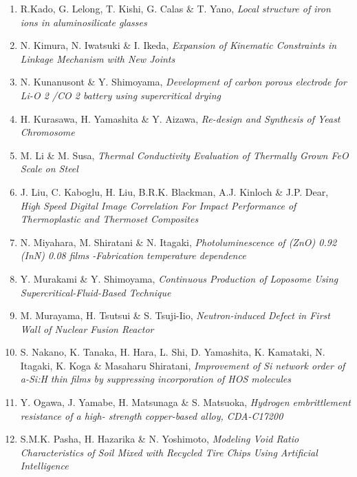 \begin{enumerate}[label=A\arabic*]
\item R.Kado, G. Lelong, T. Kishi, G. Calas \& T. Yano, {\em Local structure of iron ions
in aluminosilicate glasses}

\item N. Kimura, N. Iwatsuki \& I. Ikeda, {\em Expansion of Kinematic Constraints in Linkage
Mechanism with New Joints}

\item     N. Kunanusont \& Y. Shimoyama, {\em Development of carbon porous electrode
for Li-O 2 /CO 2 battery using supercritical drying}

\item  H. Kurasawa, H. Yamashita \& Y. Aizawa, {\em Re-design and Synthesis of Yeast Chromosome}

\item M. Li \& M. Susa, {\em Thermal Conductivity Evaluation of Thermally
Grown FeO Scale on Steel}

\item J. Liu, C. Kaboglu, H. Liu, B.R.K. Blackman, A.J. Kinloch \& J.P. Dear, {\em
  High Speed Digital Image Correlation For Impact
Performance of Thermoplastic and Thermoset
Composites}

\item N. Miyahara, M. Shiratani \& N. Itagaki, {\em Photoluminescence of (ZnO) 0.92 (InN) 0.08 films
-Fabrication temperature dependence}

\item Y. Murakami \& Y. Shimoyama, {\em Continuous Production of Loposome
Using Supercritical-Fluid-Based Technique}

\item M. Murayama, H. Tsutsui \& S. Tsuji-Iio, {\em Neutron-induced Defect in First Wall of Nuclear
Fusion Reactor}

\item S. Nakano, K. Tanaka, H. Hara, L. Shi, D. Yamashita,
K. Kamataki, N. Itagaki, K. Koga \& Masaharu Shiratani, {\em Improvement of Si network order of a-Si:H thin
films by suppressing incorporation of
HOS molecules}

\item  Y. Ogawa, J. Yamabe, H. Matsunaga \& S. Matsuoka, {\em Hydrogen embrittlement resistance of a high-
strength copper-based alloy, CDA-C17200}

\item S.M.K. Pasha, H. Hazarika \& N. Yoshimoto, {\em Modeling Void Ratio Characteristics of Soil
Mixed with Recycled Tire Chips Using Artificial
Intelligence}


\end{enumerate}
